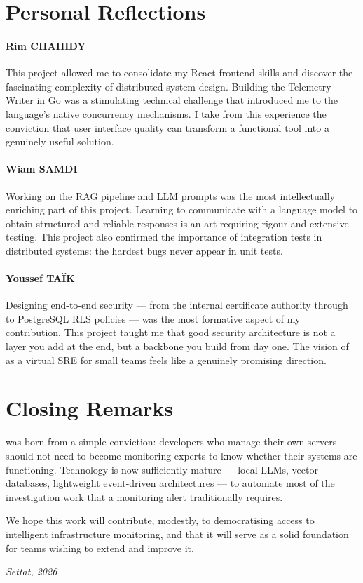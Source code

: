 \section{Personal Reflections}

\paragraph{Rim CHAHIDY}
This project allowed me to consolidate my React frontend skills and discover
the fascinating complexity of distributed system design. Building the Telemetry
Writer in Go was a stimulating technical challenge that introduced me to the
language's native concurrency mechanisms. I take from this experience the
conviction that user interface quality can transform a functional tool into
a genuinely useful solution.

\paragraph{Wiam SAMDI}
Working on the RAG pipeline and LLM prompts was the most intellectually enriching
part of this project. Learning to communicate with a language model to obtain
structured and reliable responses is an art requiring rigour and extensive testing.
This project also confirmed the importance of integration tests in distributed
systems: the hardest bugs never appear in unit tests.

\paragraph{Youssef TAÏK}
Designing end-to-end security — from the internal certificate authority through
to PostgreSQL RLS policies — was the most formative aspect of my contribution.
This project taught me that good security architecture is not a layer you add
at the end, but a backbone you build from day one. The vision of \caimp{} as
a virtual SRE for small teams feels like a genuinely promising direction.

\section{Closing Remarks}

\caimp{} was born from a simple conviction: developers who manage their own
servers should not need to become monitoring experts to know whether their
systems are functioning. Technology is now sufficiently mature — local LLMs,
vector databases, lightweight event-driven architectures — to automate most
of the investigation work that a monitoring alert traditionally requires.

We hope this work will contribute, modestly, to democratising access to
intelligent infrastructure monitoring, and that it will serve as a solid
foundation for teams wishing to extend and improve it.

\bigskip
\begin{flushright}
\textit{Settat, 2026}
\end{flushright}
